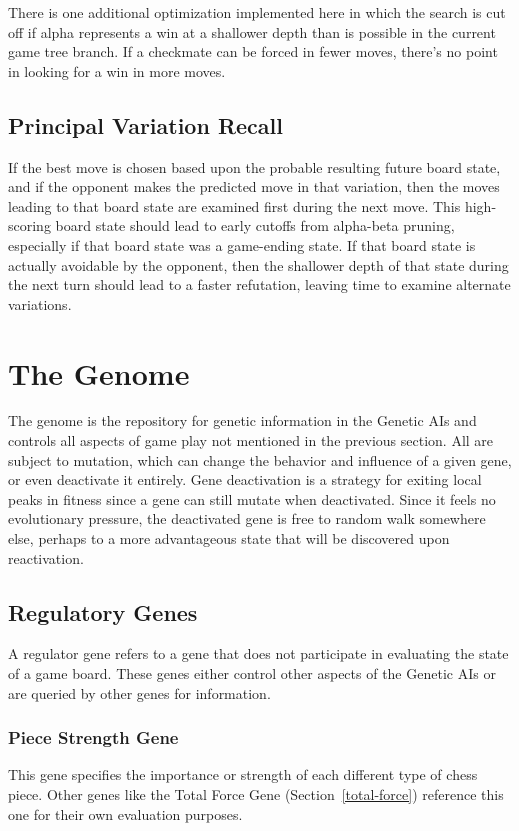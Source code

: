 \documentclass[letter]{article}
\renewcommand\_{\textunderscore\allowbreak}
\begin{document}
There is one additional optimization implemented here in which the search is cut off if alpha represents a win at a shallower depth than is possible in the current game tree branch. If a checkmate can be forced in fewer moves, there's no point in looking for a win in more moves.

\subsection{Principal Variation Recall}

If the best move is chosen based upon the probable resulting future board state, and if the opponent makes the predicted move in that variation, then the moves leading to that board state are examined first during the next move. This high-scoring board state should lead to early cutoffs from alpha-beta pruning, especially if that board state was a game-ending state. If that board state is actually avoidable by the opponent, then the shallower depth of that state during the next turn should lead to a faster refutation, leaving time to examine alternate variations.


\section{The Genome}
\label{gene-section}
The genome is the repository for genetic information in the Genetic AIs and controls all aspects of game play not mentioned in the previous section. All are subject to mutation, which can change the behavior and influence of a given gene, or even deactivate it entirely. Gene deactivation is a strategy for exiting local peaks in fitness since a gene can still mutate when deactivated. Since it feels no evolutionary pressure, the deactivated gene is free to random walk somewhere else, perhaps to a more advantageous state that will be discovered upon reactivation.

\subsection{Regulatory Genes}
A regulator gene refers to a gene that does not participate in evaluating the state of a game board. These genes either control other aspects of the Genetic AIs or are queried by other genes for information.

\subsubsection{Piece Strength Gene}
This gene specifies the importance or strength of each different type of chess piece. Other genes like the Total Force Gene (Section~\ref{total-force}) reference this one for their own evaluation purposes.
\end{document}
